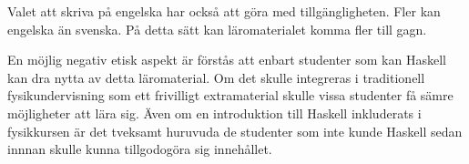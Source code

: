 Valet att skriva på engelska har också att göra med tillgängligheten. Fler kan
engelska än svenska. På detta sätt kan läromaterialet komma fler till gagn.

En möjlig negativ etisk aspekt är förstås att enbart studenter som kan Haskell kan dra nytta av detta läromaterial. Om det skulle integreras i traditionell fysikundervisning som ett frivilligt extramaterial skulle vissa studenter få sämre möjligheter att lära sig. Även om en introduktion till Haskell inkluderats i fysikkursen är det tveksamt huruvuda de studenter som inte kunde Haskell sedan innnan skulle kunna tillgodogöra sig innehållet.


